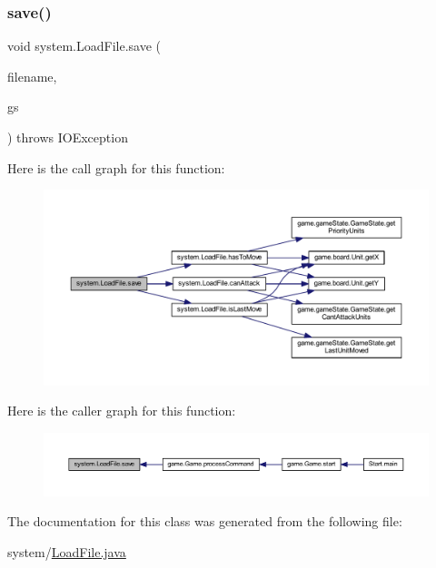 \subsubsection{\texorpdfstring{save()}{save()}}
{\footnotesize\ttfamily void system.\+Load\+File.\+save (\begin{DoxyParamCaption}\item[{String}]{filename,  }\item[{\mbox{\hyperlink{classgame_1_1game_state_1_1_game_state}{Game\+State}}}]{gs }\end{DoxyParamCaption}) throws I\+O\+Exception\hspace{0.3cm}{\ttfamily [inline]}}

Here is the call graph for this function\+:
\nopagebreak
\begin{figure}[H]
\begin{center}
\leavevmode
\includegraphics[width=350pt]{classsystem_1_1_load_file_ae74023593b3080a395c9816e3cf220d1_cgraph}
\end{center}
\end{figure}
Here is the caller graph for this function\+:
\nopagebreak
\begin{figure}[H]
\begin{center}
\leavevmode
\includegraphics[width=350pt]{classsystem_1_1_load_file_ae74023593b3080a395c9816e3cf220d1_icgraph}
\end{center}
\end{figure}


The documentation for this class was generated from the following file\+:\begin{DoxyCompactItemize}
\item 
system/\mbox{\hyperlink{_load_file_8java}{Load\+File.\+java}}\end{DoxyCompactItemize}
